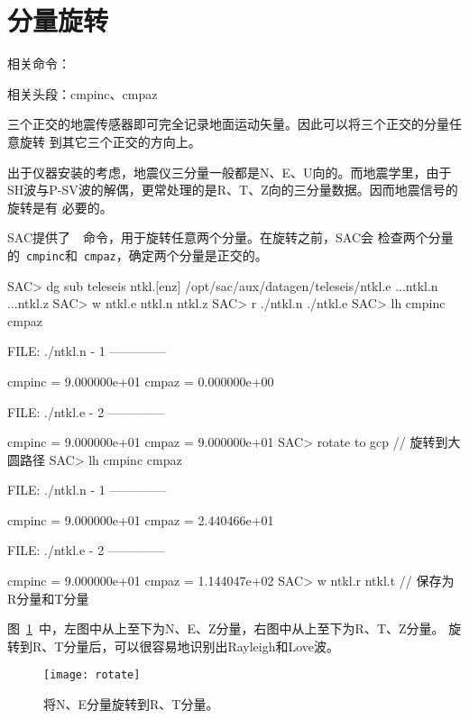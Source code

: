 \section{分量旋转}
\label{sec:traces-rotating}
相关命令：

相关头段：cmpinc、cmpaz

三个正交的地震传感器即可完全记录地面运动矢量。因此可以将三个正交的分量任意旋转
到其它三个正交的方向上。

出于仪器安装的考虑，地震仪三分量一般都是N、E、U向的。而地震学里，由于
SH波与P-SV波的解偶，更常处理的是R、T、Z向的三分量数据。因而地震信号的旋转是有
必要的。

SAC提供了~~命令，用于旋转任意两个分量。在旋转之前，SAC会
检查两个分量的~\verb+cmpinc+和~\verb+cmpaz+，确定两个分量是正交的。

\begin{SACCode}
SAC> dg sub teleseis ntkl.[enz]
/opt/sac/aux/datagen/teleseis/ntkl.e ...ntkl.n ...ntkl.z
SAC> w ntkl.e ntkl.n ntkl.z
SAC> r ./ntkl.n ./ntkl.e
SAC> lh cmpinc cmpaz

  FILE: ./ntkl.n - 1
 --------------

     cmpinc = 9.000000e+01
      cmpaz = 0.000000e+00

  FILE: ./ntkl.e - 2
 --------------

     cmpinc = 9.000000e+01
      cmpaz = 9.000000e+01
SAC> rotate to gcp              // 旋转到大圆路径
SAC> lh cmpinc cmpaz

  FILE: ./ntkl.n - 1
 --------------

     cmpinc = 9.000000e+01
      cmpaz = 2.440466e+01

  FILE: ./ntkl.e - 2
 --------------

     cmpinc = 9.000000e+01
      cmpaz = 1.144047e+02
SAC> w ntkl.r ntkl.t            // 保存为R分量和T分量
\end{SACCode}

图~\ref{fig:rotate}~中，左图中从上至下为N、E、Z分量，右图中从上至下为R、T、Z分量。
旋转到R、T分量后，可以很容易地识别出Rayleigh和Love波。

\begin{figure}[H]
\centering
\texttt{[image: rotate]}
\caption[水平分量旋转]{将N、E分量旋转到R、T分量。}
\label{fig:rotate}
\end{figure}
